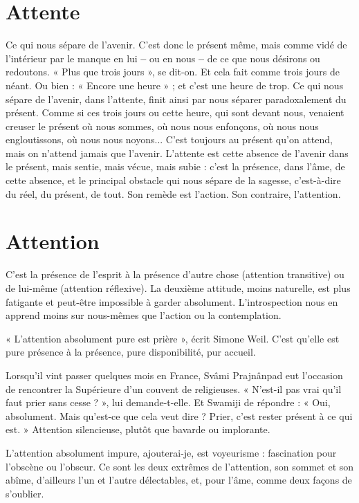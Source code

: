 \section{Attente}
Ce qui nous sépare de l’avenir. C’est donc le présent même, mais
comme vidé de l’intérieur par le manque en lui {\bf --} ou en nous {\bf --}
de ce que nous désirons ou redoutons. « Plus que trois jours », se dit-on. Et cela
fait comme trois jours de néant. Ou bien : « Encore une heure » ; et c’est une
heure de trop. Ce qui nous sépare de l’avenir, dans l'attente, finit ainsi par nous
séparer paradoxalement du présent. Comme si ces trois jours ou cette heure,
qui sont devant nous, venaient creuser le présent où nous sommes, où nous
nous enfonçons, où nous nous engloutissons, où nous nous noyons... C’est
toujours au présent qu’on attend, mais on n'attend jamais que l'avenir.
L’attente est cette absence de l’avenir dans le présent, mais sentie, mais vécue,
mais subie : c’est la présence, dans l’âme, de cette absence, et le principal obstacle
qui nous sépare de la sagesse, c’est-à-dire du réel, du présent, de tout.
Son remède est l’action. Son contraire, l'attention.

\section{Attention}
C'est la présence de l'esprit à la présence d’autre chose (attention
transitive) ou de lui-même (attention réflexive). La
deuxième attitude, moins naturelle, est plus fatigante et peut-être impossible à
garder absolument. L’introspection nous en apprend moins sur nous-mêmes
que l’action ou la contemplation.

« L’attention absolument pure est prière », écrit Simone Weil. C’est qu’elle
est pure présence à la présence, pure disponibilité, pur accueil.

Lorsqu'il vint passer quelques mois en France, Svâmi Prajnânpad eut
l’occasion de rencontrer la Supérieure d’un couvent de religieuses. « N’est-il pas
vrai qu’il faut prier sans cesse ? », lui demande-t-elle. Et Swamiji de répondre :
« Oui, absolument. Mais qu'est-ce que cela veut dire ? Prier, c’est rester présent
à ce qui est. » Attention silencieuse, plutôt que bavarde ou implorante.

L’attention absolument impure, ajouterai-je, est voyeurisme : fascination
pour l’obscène ou l'obscur. Ce sont les deux extrêmes de l'attention, son
sommet et son abîme, d’ailleurs l’un et l’autre délectables, et, pour l’âme,
comme deux façons de s’oublier.

